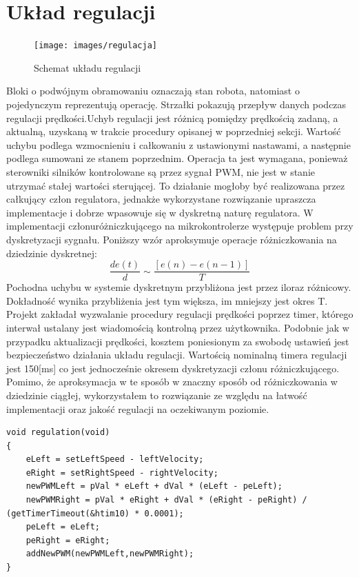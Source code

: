 \documentclass[eng,printmode]{mgr}
\begin{document}
 \section{Układ regulacji}
   \begin{figure}[ht]
    \centering
    \texttt{[image: images/regulacja]}
    \caption{Schemat układu regulacji}
    \label{fig:regulacja}
   \end{figure}

Bloki o podwójnym obramowaniu oznaczają stan robota, natomiast o pojedynczym reprezentują operację. Strzałki pokazują przepływ danych podczas regulacji prędkości.Uchyb regulacji jest różnicą pomiędzy prędkością zadaną, a aktualną, uzyskaną w trakcie procedury opisanej w poprzedniej sekcji. Wartość uchybu podlega wzmocnieniu i całkowaniu z ustawionymi nastawami, a następnie podlega sumowani ze stanem poprzednim. Operacja ta jest wymagana,  ponieważ sterowniki silników kontrolowane są przez sygnał PWM, nie jest w stanie utrzymać stałej wartości sterującej. To działanie mogłoby być realizowana przez całkujący człon regulatora, jednakże wykorzystane rozwiązanie upraszcza implementacje i dobrze wpasowuje się w dyskretną naturę regulatora.
W implementacji członuróżniczkującego na mikrokontrolerze występuje problem przy dyskretyzacji sygnału. Poniższy wzór aproksymuje operacje różniczkowania na dziedzinie dyskretnej:
\begin{equation}\label{eq:aproksymacja}
   \frac{de(t)}{d} \sim \frac{[e(n) - e(n-1)]}{T} 
  \end{equation}
Pochodna uchybu w systemie dyskretnym przybliżona jest przez iloraz różnicowy. Dokładność wynika przybliżenia jest tym większa, im mniejszy jest okres T. Projekt zakładał wyzwalanie procedury regulacji prędkości poprzez timer, którego interwał ustalany jest wiadomością kontrolną przez użytkownika. Podobnie jak w przypadku aktualizacji prędkości, kosztem poniesionym za swobodę ustawień jest bezpieczeństwo działania układu regulacji. Wartością nominalną timera regulacji jest 150[ms] co jest jednocześnie okresem dyskretyzacji członu różniczkującego. Pomimo, że aproksymacja w te sposób w znaczny sposób od różniczkowania w dziedzinie ciągłej, wykorzystałem to rozwiązanie ze względu na łatwość implementacji oraz jakość regulacji na oczekiwanym poziomie.
\begin{lstlisting}[style=c]
void regulation(void)
{
	eLeft = setLeftSpeed - leftVelocity;
	eRight = setRightSpeed - rightVelocity;
	newPWMLeft = pVal * eLeft + dVal * (eLeft - peLeft);
	newPWMRight = pVal * eRight + dVal * (eRight - peRight) / (getTimerTimeout(&htim10) * 0.0001);         
	peLeft = eLeft;
	peRight = eRight;
	addNewPWM(newPWMLeft,newPWMRight);
}
\end{lstlisting}
\end{document}
